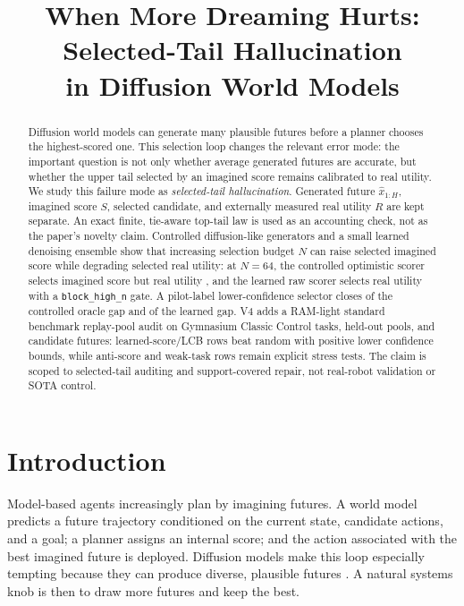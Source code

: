 \documentclass{article}
\title{\centering When More Dreaming Hurts:\\Selected-Tail Hallucination\\in Diffusion World Models}
\author{}
\newcommand{\future}{\hat{x}_{1:H}}
\newcommand{\score}{S}
\newcommand{\utility}{R}
\begin{document}
\maketitle

\begin{abstract}
Diffusion world models can generate many plausible futures before a planner chooses the highest-scored one. This selection loop changes the relevant error mode: the important question is not only whether average generated futures are accurate, but whether the upper tail selected by an imagined score remains calibrated to real utility. We study this failure mode as \emph{selected-tail hallucination}. Generated future $\future$, imagined score $\score$, selected candidate, and externally measured real utility $\utility$ are kept separate. An exact finite, tie-aware top-tail law is used as an accounting check, not as the paper's novelty claim. Controlled diffusion-like generators and a small learned denoising ensemble show that increasing selection budget $N$ can raise selected imagined score while degrading selected real utility: at $N=64$, the controlled optimistic scorer selects imagined score \VFourDWMOptimisticImagined{} but real utility \VFourDWMOptimisticReal{}, and the learned raw scorer selects real utility \VFourDWMLearnedRawReal{} with a \texttt{block\_high\_n} gate. A pilot-label lower-confidence selector closes \VFourDWMControlledGapBThirtyTwo{} of the controlled oracle gap and \VFourDWMLearnedGapBThirtyTwo{} of the learned gap. V4 adds a RAM-light standard benchmark replay-pool audit on \VFourDWMBenchmarkEnvs{} Gymnasium Classic Control tasks, \VFourDWMBenchmarkEvalPools{} held-out pools, and \VFourDWMBenchmarkCandidateRows{} candidate futures: \VFourDWMBenchmarkPositiveCIRows{} learned-score/LCB rows beat random with positive lower confidence bounds, while anti-score and weak-task rows remain explicit stress tests. The claim is scoped to selected-tail auditing and support-covered repair, not real-robot validation or SOTA control.
\end{abstract}

\section{Introduction}

Model-based agents increasingly plan by imagining futures. A world model predicts a future trajectory conditioned on the current state, candidate actions, and a goal; a planner assigns an internal score; and the action associated with the best imagined future is deployed. Diffusion models make this loop especially tempting because they can produce diverse, plausible futures \citep{ho2020ddpm,song2021score,janner2022diffuser,ajay2023decisiondiffuser,chi2023diffusionpolicy}. A natural systems knob is then to draw more futures and keep the best.
\end{document}
